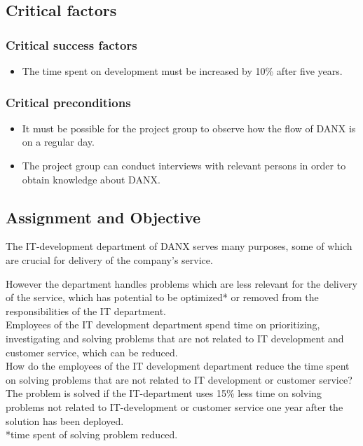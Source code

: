 \subsection{Critical factors}
\subsubsection{Critical success factors}
\begin{itemize}
	\item The time spent on development must be increased by 10\% after five years.
\end{itemize}

\subsubsection{Critical preconditions}
\begin{itemize}
	\item It must be possible for the project group to observe how the flow of DANX is on a regular day.
	\item The project group can conduct interviews with relevant persons in order to obtain knowledge about DANX.
\end{itemize}

\subsection{Assignment and Objective}
The IT-development department of DANX serves many purposes, some of which are crucial for delivery of the company’s service.

However the department handles problems which are less relevant for the delivery of the service, which has potential to be optimized* or removed from the responsibilities of the IT department. \\

Employees of the IT development department spend time on prioritizing, investigating and solving problems that are not related to IT development and customer service, which can be reduced. \\

How do the employees of the IT development department reduce the time spent on solving problems that are not related to IT development or customer service? \\

The problem is solved if the IT-department uses 15\% less time on solving problems not related to IT-development or customer service one year after the solution has been deployed. \\
\small{*time spent of solving problem reduced.}\\

